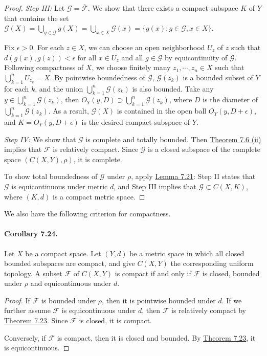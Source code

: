 \documentclass{article}
\numberwithin{equation}{section}
\theoremstyle{plain}
\theoremstyle{definition}
\begin{document}
\begin{proof}
\vspace{0.12cm}
\textit{Step III:} Let $\mathcal{G}=\overline{\mathcal{F}}$. We show that there exists a compact subspace $K$ of $Y$ that contains the set $\mathcal{G}(X) = \bigcup_{g\in\mathcal{G}} g(X) = \bigcup_{x\in X}\mathcal{G}(x) = \{g(x): g\in\mathcal{G},x\in X\}$.

Fix $\epsilon > 0$. For each $z\in X$, we can choose an open neighborhood $U_z$ of $z$ such that $d(g(x),g(z))<\epsilon$ for all $x\in U_z$ and all $g\in\mathcal{G}$ by equicontinuity of $\mathcal{G}$. Following compactness of $X$, we choose finitely many $z_1,\cdots,z_n\in X$ such that $\bigcup_{k=1}^n U_{z_k}= X$. By pointwise boundedness of $\mathcal{G}$, $\mathcal{G}(z_k)$ is a bounded subset of $Y$ for each $k$, and the union $\bigcup_{k=1}^n\mathcal{G}(z_k)$ is also bounded. Take any $y\in\bigcup_{k=1}^n\mathcal{G}(z_k)$, then $O_Y(y,D)\supset\bigcup_{k=1}^n\mathcal{G}(z_k)$, where $D$ is the diameter of $\bigcup_{k=1}^n\mathcal{G}(z_k)$. As a result, $\mathcal{G}(X)$ is contained in the open ball $O_Y(y,D+\epsilon)$, and  $K=\overline{O_Y(y,D+\epsilon)}$ is the desired compact subspace of $Y$.

\vspace{0.12cm}
\textit{Step IV:} We show that $\mathcal{G}$ is complete and totally bounded. Then \hyperref[thm:7.6]{Theorem 7.6 (ii)} implies that $\mathcal{F}$ is relatively compact. Since $\mathcal{G}$ is a closed subspace of the complete space $(C(X,Y),\rho)$, it is complete. 

To show total boundedness of $\mathcal{G}$ under $\rho$, apply \hyperref[lemma:7.21]{Lemma 7.21}: Step II states that $\mathcal{G}$ is equicontinuous under metric $d$, and Step III implies that $\mathcal{G}\subset C(X,K)$, where $(K,d)$ is a compact metric space.
\end{proof}

We also have the following criterion for compactness.

\paragraph{Corollary 7.24.\label{cor:7.24}} Let $X$ be a compact space. Let $(Y,d)$ be a metric space in which all closed bounded subspaces are compact, and give $C(X,Y)$ the corresponding uniform topology. A subset $\mathcal{F}$ of $C(X,Y)$ is compact if and only if $\mathcal{F}$ is closed, bounded under $\rho$ and equicontinuous under $d$.
\begin{proof}
If $\mathcal{F}$ is bounded under $\rho$, then it is pointwise bounded under $d$. If we further assume $\mathcal{F}$ is equicontinuous under $d$, then $\mathcal{F}$ is relatively compact by \hyperref[thm:7.23]{Theorem 7.23}. Since $\mathcal{F}$ is closed, it is compact.

Conversely, if $\mathcal{F}$ is compact, then it is closed and bounded. By \hyperref[thm:7.23]{Theorem 7.23}, it is equicontinuous.
\end{proof}
\end{document}

